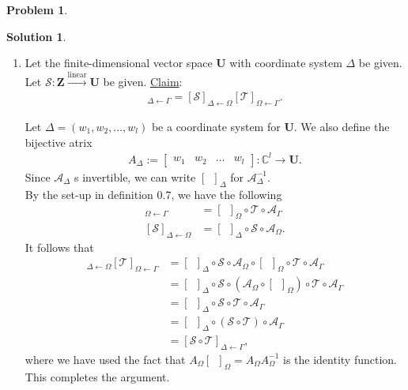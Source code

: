 \documentclass{book}
\theoremstyle{definition}
\newtheorem*{prob*}{Problem}
\newtheorem*{sln*}{Solution}
\newcommand{\Z}{\mathbf{Z}}
\newcommand{\U}{\mathbf{U}}
\newcommand{\lin}{\overset{\text{linear}}{\longrightarrow}}
\newcommand{\T}{\mathcal{T}}
\begin{document}
\begin{prob*}
\begin{sln*}
\begin{enumerate}
 			
 			
 			
 			
 			\item Let the finite-dimensional vector space $\U$ with coordinate system $\Delta$ be given. Let $\mathcal{S}:\Z \lin \U$ be given. \underline{Claim}:
			\begin{align*}
 			[\mathcal{S} \circ \T]_{\Delta\leftarrow\Gamma} = [\mathcal{S}]_{\Delta\leftarrow\Omega}[\T]_{\Omega\leftarrow\Gamma}.
 			\end{align*}
 			
 			Let $\Delta = (w_1,w_2,\dots,w_l)$ be a coordinate system for $\U$. We also define the bijective atrix
 			\begin{align*}
 			A_\Delta := \begin{bmatrix}
 			w_1&w_2&\dots&w_l
 			\end{bmatrix} : \mathbb{C}^l \rightarrow \U.
 			\end{align*}
 			Since $\mathcal{A}_\Delta$ s invertible, we can write $[\,\,\,]_\Delta$ for $\mathcal{A}^{-1}_\Delta$. \\
 			
			By the set-up in definition 0.7, we have the following
			\begin{align*}
			[\T]_{\Omega\leftarrow \Gamma} &= [\,\,\,]_\Omega\circ \T\circ \mathcal{A}_\Gamma\\
			[\mathcal{S}]_{\Delta\leftarrow\Omega} &= [\,\,\,]_\Delta \circ \mathcal{S} \circ \mathcal{A}_\Omega.			
			\end{align*}
 			It follows that
 			\begin{align*}
 			[\mathcal{S}]_{\Delta \leftarrow \Omega}[\mathcal{T}]_{\Omega\leftarrow\Gamma}
			&= [\,\,\,]_\Delta \circ \mathcal{S} \circ \mathcal{A}_\Omega \circ [\,\,\,]_\Omega\circ \T\circ \mathcal{A}_\Gamma\\
			&= [\,\,\,]_\Delta \circ \mathcal{S} \circ \left( \mathcal{A}_\Omega \circ [\,\,\,]_\Omega \right) \circ \T\circ \mathcal{A}_\Gamma\\
			&= [\,\,\,]_\Delta \circ \mathcal{S} \circ \T\circ \mathcal{A}_\Gamma\\
			&= [\,\,\,]_\Delta \circ \left(\mathcal{S} \circ \T \right) \circ \mathcal{A}_\Gamma\\
			&= [\mathcal{S}\circ \T]_{\Delta \leftarrow \Gamma},
 			\end{align*}
			where we have used the fact that $A_\Omega [\,\,\,]_\Omega = A_\Omega A_\Omega^{-1}$ is the identity function. This completes the argument. \\
			

\end{enumerate}
\end{sln*}
\end{prob*}
\end{document}
